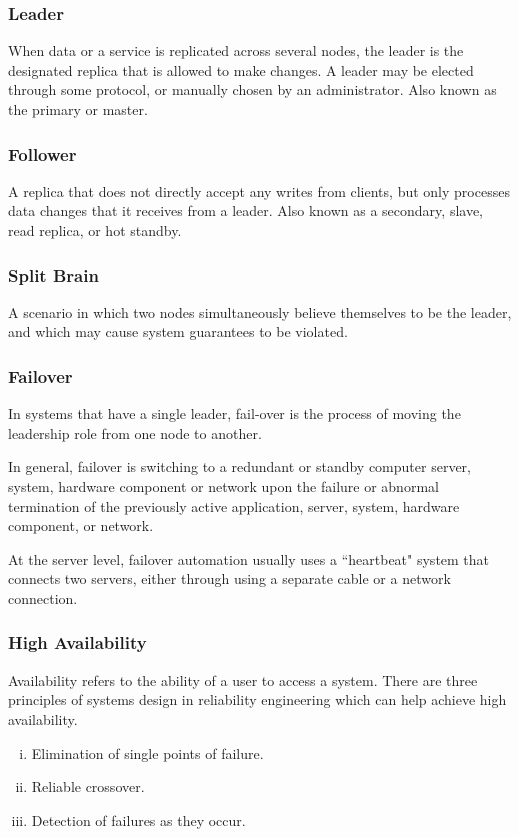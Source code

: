 \documentclass{article}
\begin{document}
    \subsubsection{Leader}
    When data or a service is replicated across several nodes, the leader is the designated replica that is allowed to make changes. A leader may be elected through some protocol, or manually chosen by an administrator. Also known as the primary or master.
    
    \subsubsection{Follower}
    A replica that does not directly accept any writes from clients, but only processes data changes that it receives from a leader. Also known as a secondary, slave, read replica, or hot standby.
    
    \subsubsection{Split Brain} 
    A scenario in which two nodes simultaneously believe themselves to be the leader, and which may cause system guarantees to be violated.
    
    \subsubsection{Failover}
    In systems that have a single leader, fail-over is the process of moving the leadership role from one node to another.
    
    In general, failover is switching to a redundant or standby computer server, system, hardware component or network upon the failure or abnormal termination of the previously active application, server, system, hardware component, or network.
    
    At the server level, failover automation usually uses a ``heartbeat" system that connects two servers, either through using a separate cable or a network connection.
    
    \subsubsection{High Availability}
     Availability refers to the ability of a user to access a system. There are three principles of systems design in reliability engineering which can help achieve high availability.
    \begin{enumerate}[i.]
        \item Elimination of single points of failure. 
        \item Reliable crossover. 
        \item Detection of failures as they occur.
    \end{enumerate}
    
\end{document}
